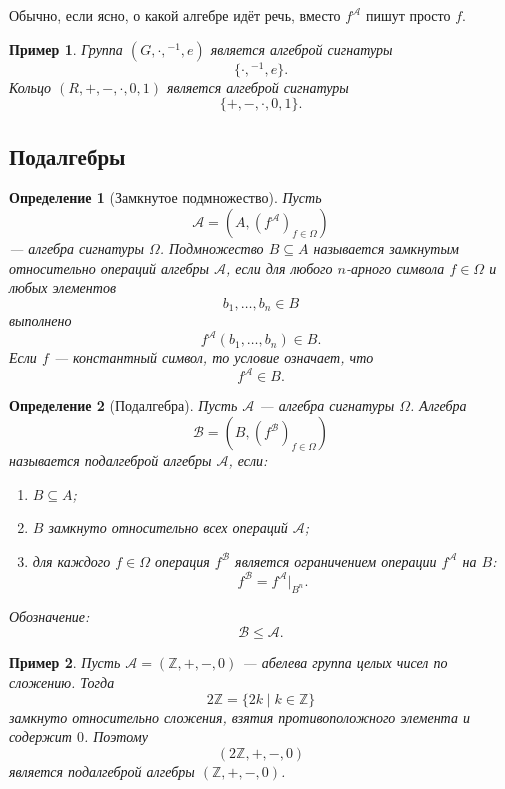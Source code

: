 \documentclass[12pt,a4paper]{article}
\newtheorem{definition}{Определение}
\newtheorem{example}{Пример}
\begin{document}
Обычно, если ясно, о какой алгебре идёт речь, вместо $f^{\mathcal A}$ пишут просто $f$.

\begin{example}
Группа $(G,\cdot,{}^{-1},e)$ является алгеброй сигнатуры
\[
\{\cdot,{}^{-1},e\}.
\]
Кольцо $(R,+,-,\cdot,0,1)$ является алгеброй сигнатуры
\[
\{+,-,\cdot,0,1\}.
\]
\end{example}

\subsection{Подалгебры}

\begin{definition}[Замкнутое подмножество]
Пусть
\[
\mathcal A=(A,(f^{\mathcal A})_{f\in\Omega})
\]
--- алгебра сигнатуры $\Omega$. Подмножество $B\subseteq A$ называется \emph{замкнутым относительно операций алгебры $\mathcal A$}, если для любого $n$-арного символа $f\in\Omega$ и любых элементов
\[
b_1,\dots,b_n\in B
\]
выполнено
\[
f^{\mathcal A}(b_1,\dots,b_n)\in B.
\]
Если $f$ --- константный символ, то условие означает, что
\[
f^{\mathcal A}\in B.
\]
\end{definition}

\begin{definition}[Подалгебра]
Пусть $\mathcal A$ --- алгебра сигнатуры $\Omega$. Алгебра
\[
\mathcal B=(B,(f^{\mathcal B})_{f\in\Omega})
\]
называется \emph{подалгеброй} алгебры $\mathcal A$, если:
\begin{enumerate}
    \item $B\subseteq A$;
    \item $B$ замкнуто относительно всех операций $\mathcal A$;
    \item для каждого $f\in\Omega$ операция $f^{\mathcal B}$ является ограничением операции $f^{\mathcal A}$ на $B$:
    \[
    f^{\mathcal B}=f^{\mathcal A}\big|_{B^n}.
    \]
\end{enumerate}
Обозначение:
\[
\mathcal B\leqslant \mathcal A.
\]
\end{definition}

\begin{example}
Пусть $\mathcal A=(\mathbb Z,+,-,0)$ --- абелева группа целых чисел по сложению. Тогда
\[
2\mathbb Z=\{2k\mid k\in\mathbb Z\}
\]
замкнуто относительно сложения, взятия противоположного элемента и содержит $0$. Поэтому
\[
(2\mathbb Z,+,-,0)
\]
является подалгеброй алгебры $(\mathbb Z,+,-,0)$.
\end{example}
\end{document}
